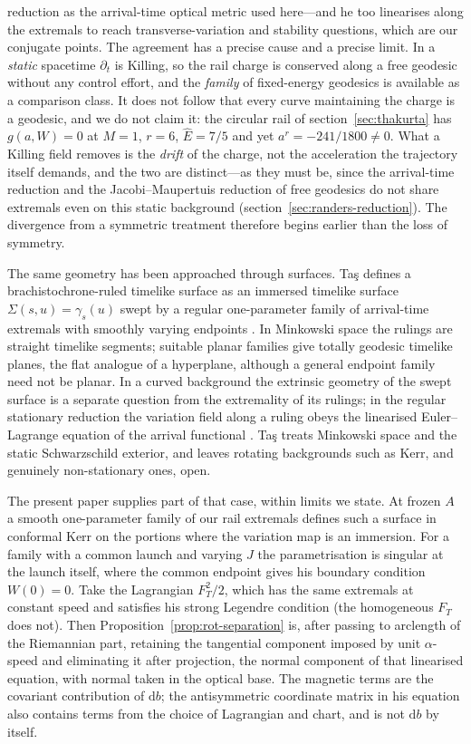 \documentclass[12pt]{iopart}
\theoremstyle{plain}
\theoremstyle{definition}
\theoremstyle{remark}
\newcommand{\Ehat}{\hat E}
\newcommand{\dd}{\mathrm{d}}
\begin{document}
reduction as the arrival-time optical metric used here---and he too linearises along
the extremals to reach transverse-variation and stability questions, which are our
conjugate points. The agreement has a precise cause and a precise limit. In a
\emph{static} spacetime $\partial_t$ is Killing, so the rail charge is conserved
along a free geodesic without any control effort, and the \emph{family} of
fixed-energy geodesics is available as a comparison class. It does not follow
that every curve maintaining the charge is a geodesic, and we do not claim it:
the circular rail of section~\ref{sec:thakurta} has $g(a,W)=0$ at
$M=1$, $r=6$, $\Ehat=7/5$ and yet $a^r=-241/1800\neq0$. What a Killing field
removes is the \emph{drift} of the charge, not the acceleration the trajectory
itself demands, and the two are distinct---as they must be, since the
arrival-time reduction and the Jacobi--Maupertuis reduction of free geodesics do
not share extremals even on this static background
(section~\ref{sec:randers-reduction}). The divergence from a symmetric treatment
therefore begins earlier than the loss of symmetry.

The same geometry has been approached through surfaces. Ta\c{s} defines a
brachistochrone-ruled timelike surface as an immersed timelike surface
$\Sigma(s,u)=\gamma_s(u)$ swept by a regular one-parameter family of arrival-time
extremals with smoothly varying endpoints \cite[Definition~3]{Tas2025}. In Minkowski space
the rulings are straight timelike segments; suitable planar families give totally geodesic
timelike planes, the flat analogue of a hyperplane, although a general endpoint family
need not be planar. In a curved background the extrinsic geometry of the swept surface
is a separate question from the extremality of its rulings; in the regular stationary
reduction the variation field along a ruling obeys the linearised Euler--Lagrange
equation of the arrival functional \cite[Proposition~4]{Tas2025}. Ta\c{s} treats Minkowski space and the static Schwarzschild
exterior, and leaves rotating backgrounds such as Kerr, and genuinely non-stationary ones,
open.

The present paper supplies part of that case, within limits we state. At frozen $A$ a
smooth one-parameter family of our rail extremals defines such a surface in conformal
Kerr on the portions where the variation map is an immersion. For a family with a common
launch and varying $J$ the parametrisation is singular at the launch itself, where the
common endpoint gives his boundary condition $W(0)=0$. Take the Lagrangian $F_T^2/2$, which
has the same extremals at constant speed and satisfies his strong Legendre condition (the
homogeneous $F_T$ does not). Then Proposition~\ref{prop:rot-separation} is, after passing to
arclength of the Riemannian part, retaining the tangential component imposed by unit
$\alpha$-speed and eliminating it after projection, the normal component of that
linearised equation, with normal taken in the optical base. The magnetic
terms are the covariant contribution of $\dd b$; the antisymmetric coordinate matrix in his
equation also contains terms from the choice of Lagrangian and chart, and is not $\dd b$
by itself.
\end{document}

